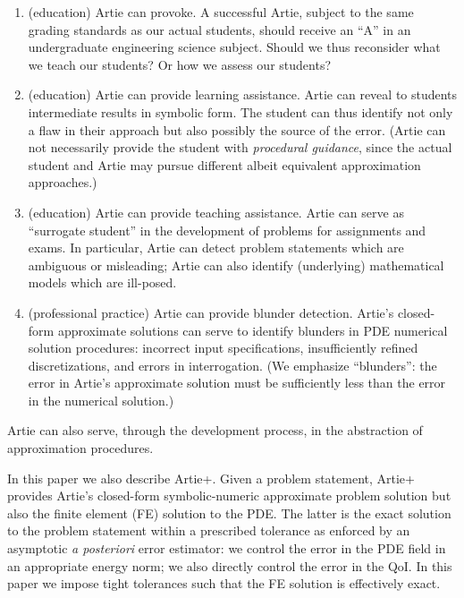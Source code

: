 \documentclass[preprint,12pt]{article}
\begin{document}
\begin{enumerate}
\item (education) Artie can provoke. A successful Artie, subject to the same grading standards as our actual students, should receive an ``A'' in an undergraduate engineering science subject. Should we thus reconsider what we teach our students? Or how we assess our students?

\item (education) Artie can provide learning assistance. Artie can reveal to students intermediate results in symbolic form. The student can thus identify not only a flaw in their approach but also possibly the source of the error. (Artie can not necessarily provide the student with {\em procedural guidance}, since the actual student and Artie may pursue different albeit equivalent approximation approaches.)  

\item (education) Artie can provide teaching assistance. Artie can serve as ``surrogate student'' in the development of problems for assignments and exams. In particular, Artie can detect problem statements which are ambiguous or misleading; Artie can also identify (underlying) mathematical models which are ill-posed.

\item (professional practice) Artie can provide blunder detection. Artie's closed-form approximate solutions can serve to identify blunders in PDE numerical solution procedures: incorrect input specifications, insufficiently refined discretizations, and errors in interrogation. (We emphasize ``blunders'':  the error in Artie's approximate solution must be sufficiently less than the error in the numerical solution.)

\end{enumerate}
Artie can also serve, through the development process, in the abstraction of approximation procedures.

In this paper we also describe Artie+. Given a problem statement, Artie+ provides Artie's closed-form symbolic-numeric approximate problem solution but also the finite element (FE) solution to the PDE. The latter is the exact solution to the problem statement within a prescribed tolerance as enforced by an asymptotic {\it a posteriori} error estimator: we control the error in the PDE field in an appropriate energy norm; we also directly control  the error in the QoI. In this paper we impose tight tolerances such that the FE solution is effectively exact.
\end{document}
